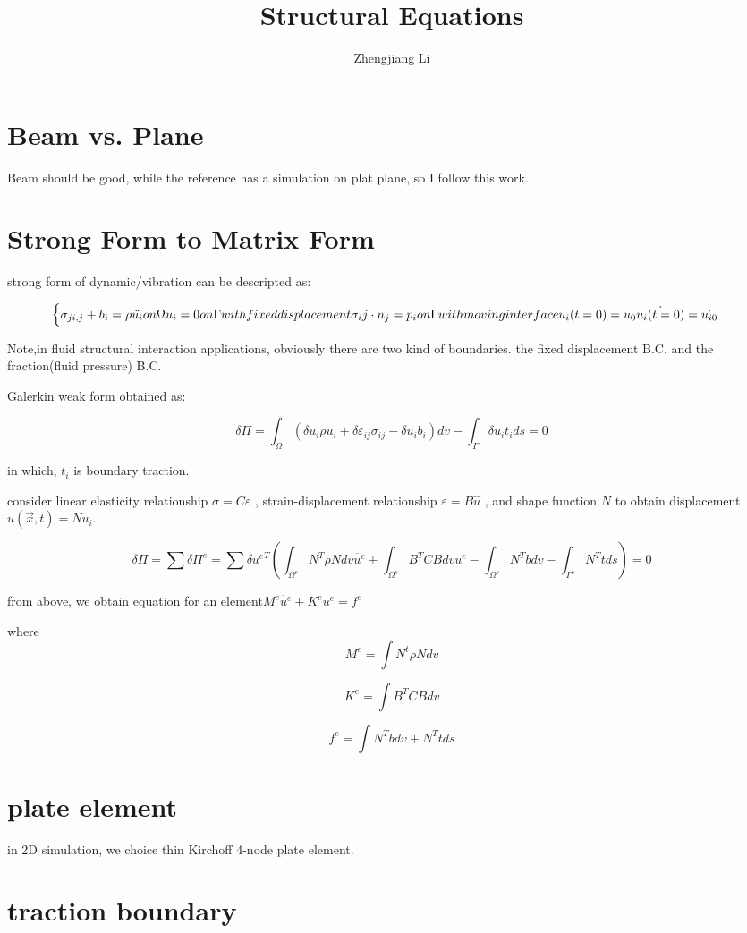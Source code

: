 \documentclass[11pt]{article}
\begin{document}
\title{Structural Equations}

\author{Zhengjiang Li}

\date{}

\maketitle

\section{Beam vs. Plane}
Beam should be good, while the reference has a simulation on plat plane, so I follow this work.

\section{Strong Form to Matrix Form}

strong form of dynamic/vibration can be descripted as:
  
  \[
  \begin{cases}
  $$ \sigma_{ji,j} + b_i = \rho \ddot{u_i} on \Omega $$
  $$ u_i = 0  on \Gamma with fixed displacement $$
  $$ \sigma_ij \cdot n_j = p_i on \Gamma with moving interface $$
  $$ u_i(t=0) = u_0$$
  $$ \dot{u_i(t=0)} = \dot{u_{i0}} $$
  \end{cases} 
  \]

Note,in fluid structural interaction applications, obviously there are two kind of boundaries. the fixed displacement B.C. and the fraction(fluid pressure) B.C.

Galerkin weak form obtained as:

  $$ \delta \Pi =  \int_{\Omega} (\delta u_i \rho \ddot{u_i} + \delta \varepsilon_{ij} \sigma_{ij} - \delta u_i b_i )dv  - \int_{\Gamma} \delta u_i t_i ds = 0 $$

 in which, $t_i$ is boundary traction.

 
consider linear elasticity relationship $ \sigma = C \varepsilon $
, strain-displacement relationship $ \varepsilon = B \hat{u}$ , and shape function $N$ to obtain displacement $u(\vec{x}, t) = N u_i$.

 $$ \delta \Pi = \sum {\delta \Pi}^e = \sum \delta {u^e}^T (\int_{\Omega^e} N^T \rho N dv \ddot{u^e} + \int_{\Omega^e} B^T C B dv {u^e} - \int_{\Omega^e} N^T b dv - \int_{\Gamma^e} N^T t ds ) = 0 $$

from above, we obtain equation for an element$ M^e \ddot{u^e} + K^e {u^e} = f^e $

where $$ M^e = \int N^t \rho N dv $$

	$$ K^e = \int B^T C B dv $$

	$$ f^e = \int N^T b dv + N^T t ds $$

\section {plate element}
in 2D simulation, we choice thin Kirchoff 4-node plate element.

\section {traction boundary}
\end{document}
